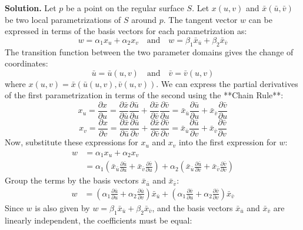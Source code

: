 \documentclass[12pt, a4paper, oneside]{article}
\newenvironment{solution}
  {\par\noindent\textbf{Solution. }\newline}
  {\par}
\begin{document}
\begin{solution}
Let $p$ be a point on the regular surface $S$. Let $x(u,v)$ and $\bar{x}(\bar{u},\bar{v})$ be two local parametrizations of $S$ around $p$.
The tangent vector $w$ can be expressed in terms of the basis vectors for each parametrization as:
$$
w=\alpha_{1}x_{u}+\alpha_{2}x_{v} \quad \text{and} \quad w=\beta_{1}\bar{x}_{\bar{u}}+\beta_{2}\bar{x}_{\bar{v}}
$$
The transition function between the two parameter domains gives the change of coordinates:
$$
\bar{u} = \bar{u}(u,v) \quad \text{and} \quad \bar{v} = \bar{v}(u,v)
$$
where $x(u,v) = \bar{x}(\bar{u}(u,v), \bar{v}(u,v))$.
We can express the partial derivatives of the first parametrization in terms of the second using the **Chain Rule**:
$$
x_{u} = \frac{\partial x}{\partial u} = \frac{\partial \bar{x}}{\partial \bar{u}} \frac{\partial \bar{u}}{\partial u} + \frac{\partial \bar{x}}{\partial \bar{v}} \frac{\partial \bar{v}}{\partial u} = \bar{x}_{\bar{u}} \frac{\partial \bar{u}}{\partial u} + \bar{x}_{\bar{v}} \frac{\partial \bar{v}}{\partial u}
$$
$$
x_{v} = \frac{\partial x}{\partial v} = \frac{\partial \bar{x}}{\partial \bar{u}} \frac{\partial \bar{u}}{\partial v} + \frac{\partial \bar{x}}{\partial \bar{v}} \frac{\partial \bar{v}}{\partial v} = \bar{x}_{\bar{u}} \frac{\partial \bar{u}}{\partial v} + \bar{x}_{\bar{v}} \frac{\partial \bar{v}}{\partial v}
$$
Now, substitute these expressions for $x_u$ and $x_v$ into the first expression for $w$:
\begin{align*}
w &= \alpha_{1}x_{u}+\alpha_{2}x_{v} \\
&= \alpha_{1} \left( \bar{x}_{\bar{u}} \frac{\partial \bar{u}}{\partial u} + \bar{x}_{\bar{v}} \frac{\partial \bar{v}}{\partial u} \right) + \alpha_{2} \left( \bar{x}_{\bar{u}} \frac{\partial \bar{u}}{\partial v} + \bar{x}_{\bar{v}} \frac{\partial \bar{v}}{\partial v} \right)
\end{align*}
Group the terms by the basis vectors $\bar{x}_{\bar{u}}$ and $\bar{x}_{\bar{v}}$:
\begin{align*}
w &= \left( \alpha_{1} \frac{\partial \bar{u}}{\partial u} + \alpha_{2} \frac{\partial \bar{u}}{\partial v} \right) \bar{x}_{\bar{u}} + \left( \alpha_{1} \frac{\partial \bar{v}}{\partial u} + \alpha_{2} \frac{\partial \bar{v}}{\partial v} \right) \bar{x}_{\bar{v}}
\end{align*}
Since $w$ is also given by $w=\beta_{1}\bar{x}_{\bar{u}}+\beta_{2}\bar{x}_{\bar{v}}$, and the basis vectors $\bar{x}_{\bar{u}}$ and $\bar{x}_{\bar{v}}$ are linearly independent, the coefficients must be equal:

\end{solution}
\end{document}
